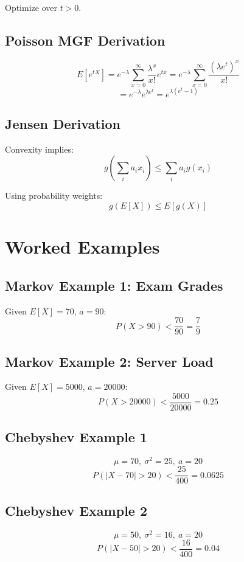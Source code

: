 \documentclass[11pt]{article}
\begin{document}
Optimize over $t>0$.

\subsection*{Poisson MGF Derivation}

\[
E[e^{tX}]
= e^{-\lambda} \sum_{x=0}^{\infty} \frac{\lambda^x}{x!} e^{tx}
= e^{-\lambda} \sum_{x=0}^\infty \frac{(\lambda e^t)^x}{x!}
\]
\[
= e^{-\lambda} e^{\lambda e^t}
= e^{\lambda(e^t - 1)}
\]

\subsection*{Jensen Derivation}

Convexity implies:
\[
g\left(\sum_i a_i x_i\right) \le \sum_i a_i g(x_i)
\]

Using probability weights:
\[
g(E[X]) \le E[g(X)]
\]

\section{Worked Examples}

\subsection*{Markov Example 1: Exam Grades}

Given $E[X]=70$, $a=90$:
\[
P(X>90) < \frac{70}{90} = \frac79
\]

\subsection*{Markov Example 2: Server Load}

Given $E[X]=5000$, $a=20000$:
\[
P(X>20000) < \frac{5000}{20000} = 0.25
\]

\subsection*{Chebyshev Example 1}

\[
\mu=70,\ \sigma^2=25,\ a=20
\]
\[
P(|X-70|>20) < \frac{25}{400} = 0.0625
\]

\subsection*{Chebyshev Example 2}

\[
\mu=50,\ \sigma^2=16,\ a=20
\]
\[
P(|X-50|>20) < \frac{16}{400} = 0.04
\]
\end{document}
